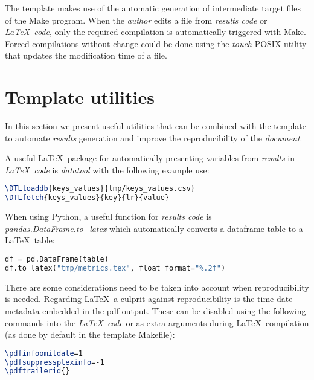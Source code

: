 \documentclass[journal]{IEEEtran}
\begin{document}
The template makes use of the automatic generation of intermediate target files of the Make program.
When the \textit{author} edits a file from \textit{results code} or \textit{\LaTeX\ code}, only the required compilation is automatically triggered with Make.
Forced compilations without change could be done using the \textit{touch} POSIX utility that updates the modification time of a file.

\section{Template utilities}
In this section we present useful utilities that can be combined with the template to automate \textit{results} generation and improve the reproducibility of the \textit{document}.

A useful \LaTeX\ package for automatically presenting variables from \textit{results} in \textit{\LaTeX\ code} is \textit{datatool} with the following example use:
\begin{lstlisting}[language=TeX, style=lststyle, caption={\LaTeX\ datatool example of loading a file that contains pairs of keys and values (tmp/keys\_values.csv) generated by a \textit{results code} and getting the value of a key named lr.}]
\DTLloaddb{keys_values}{tmp/keys_values.csv}
\DTLfetch{keys_values}{key}{lr}{value}
\end{lstlisting}

When using Python, a useful function for \textit{results code} is \textit{pandas.DataFrame.to\_latex} which automatically converts a dataframe table to a \LaTeX\ table:
\begin{lstlisting}[language=python, style=lststyle, caption={Convert Pandas DataFrame (df) to \LaTeX\ table (tmp/metrics.tex) in \textit{results code}.}]
df = pd.DataFrame(table)
df.to_latex("tmp/metrics.tex", float_format="%.2f")
\end{lstlisting}

There are some considerations need to be taken into account when reproducibility is needed.
Regarding \LaTeX\, a culprit against reproducibility is the time-date metadata embedded in the pdf output.
These can be disabled using the following commands into the \textit{\LaTeX\ code} or as extra arguments during \LaTeX\ compilation (as done by default in the template Makefile):
\begin{lstlisting}[language=TeX, style=lststyle, caption={\LaTeX\ pdf reproducibility commands.}]
\pdfinfoomitdate=1
\pdfsuppressptexinfo=-1
\pdftrailerid{}
\end{lstlisting}
\end{document}

